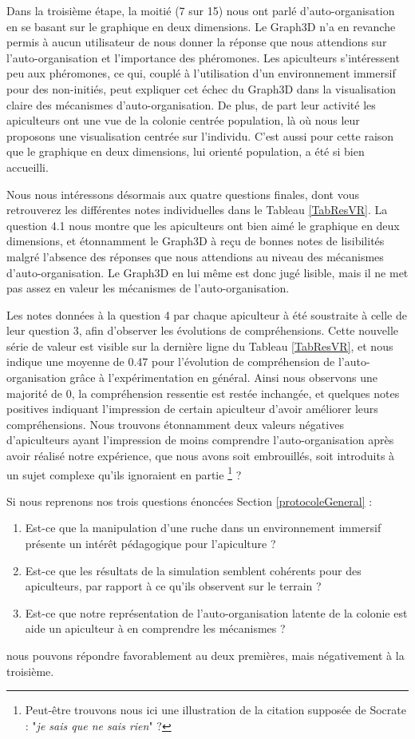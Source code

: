     Dans la troisième étape, la moitié (7 sur 15) nous ont parlé d'auto-organisation en se basant sur le graphique en deux dimensions. Le Graph3D n'a en revanche permis à aucun utilisateur de nous donner la réponse que nous attendions sur l'auto-organisation et l'importance des phéromones. 
Les apiculteurs s'intéressent peu aux phéromones, ce qui, couplé à l'utilisation d'un environnement immersif pour des non-initiés, peut expliquer cet échec du Graph3D dans la visualisation claire des mécanismes d'auto-organisation. De plus, de part leur activité les apiculteurs ont une vue de la colonie centrée population, là où nous leur proposons une visualisation centrée sur l'individu. C'est aussi pour cette raison que le graphique en deux dimensions, lui orienté population, a été si bien accueilli.

	Nous nous intéressons désormais aux quatre questions finales, dont vous retrouverez les différentes notes individuelles dans le Tableau \ref{TabResVR}. La question 4.1 nous montre que les apiculteurs ont bien aimé le graphique en deux dimensions, et étonnamment le Graph3D à reçu de bonnes notes de lisibilités malgré l'absence des réponses que nous attendions au niveau des mécanismes d'auto-organisation. Le Graph3D en lui même est donc jugé lisible, mais il ne met pas assez en valeur les mécanismes de l'auto-organisation. 
	
	Les notes données à la question 4 par chaque apiculteur à été soustraite à celle de leur question 3, afin d'observer les évolutions de compréhensions. Cette nouvelle série de valeur est visible sur la dernière ligne du Tableau \ref{TabResVR}, et nous indique une moyenne de 0.47 pour l'évolution de compréhension de l'auto-organisation grâce à l'expérimentation en général. 
	Ainsi nous observons une majorité de 0, la compréhension ressentie est restée inchangée, et quelques notes positives indiquant l'impression de certain apiculteur d'avoir améliorer leurs compréhensions. Nous trouvons étonnamment deux valeurs négatives d'apiculteurs ayant l'impression de moins comprendre l'auto-organisation après avoir réalisé notre expérience, que nous avons soit embrouillés, soit introduits à un sujet complexe qu'ils ignoraient en partie \footnote{Peut-être trouvons nous ici une illustration de la citation supposée de Socrate : "\textit{je sais que ne sais rien}" ?} ?
	
	Si nous reprenons nos trois questions énoncées Section \ref{protocoleGeneral} : 
		\begin{enumerate}
			\item Est-ce que la manipulation d'une ruche dans un environnement immersif présente un intérêt pédagogique pour l'apiculture ?
			\item Est-ce que les résultats de la simulation semblent cohérents pour des apiculteurs, par rapport à ce qu'ils observent sur le terrain ?
			\item Est-ce que notre représentation de l'auto-organisation latente de la colonie est aide un apiculteur à en comprendre les mécanismes ?
		\end{enumerate}	
	 nous pouvons répondre favorablement au deux premières, mais négativement à la troisième.
	 
